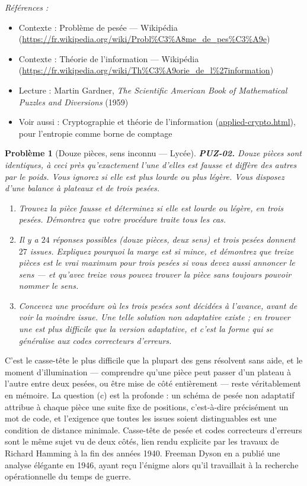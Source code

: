 \documentclass[11pt]{article}
\newtheorem{problem}{Problème}
\newenvironment{refs}{\par\small\noindent\emph{Références :}\begin{itemize}\setlength\itemsep{0pt}}{\end{itemize}\normalsize}
\begin{document}
\begin{refs}
\item Contexte : Problème de pesée --- Wikipédia (\url{https://fr.wikipedia.org/wiki/Probl%C3%A8me_de_pes%C3%A9e})
\item Contexte : Théorie de l'information --- Wikipédia (\url{https://fr.wikipedia.org/wiki/Th%C3%A9orie_de_l%27information})
\item Lecture : Martin Gardner, \textit{The Scientific American Book of Mathematical Puzzles and Diversions} (1959)
\item Voir aussi : Cryptographie et théorie de l'information (\url{applied-crypto.html}), pour l'entropie comme borne de comptage
\end{refs}

\bigskip

\begin{problem}[{Douze pièces, sens inconnu --- Lycée}]
\textbf{PUZ-02.} Douze pièces sont identiques, à ceci près qu'exactement l'une d'elles
est fausse et diffère des autres par le poids. Vous ignorez si elle est plus lourde ou
plus légère. Vous disposez d'une balance à plateaux et de trois pesées.
\begin{enumerate}
\item[(a)] Trouvez la pièce fausse \textit{et} déterminez si elle est lourde ou légère, en trois
pesées. Démontrez que votre procédure traite tous les cas.
\item[(b)] Il y a $ 24 $ réponses possibles (douze pièces, deux sens) et trois pesées donnent
$ 27 $ issues. Expliquez pourquoi la marge est si mince, et démontrez que treize pièces
est le vrai maximum pour trois pesées si vous devez aussi annoncer le sens --- et qu'avec
treize vous pouvez trouver la pièce sans toujours pouvoir nommer le sens.
\item[(c)] Concevez une procédure où les trois pesées sont décidées \textit{à l'avance}, avant de
voir la moindre issue. Une telle solution non adaptative existe ; en trouver une est plus
difficile que la version adaptative, et c'est la forme qui se généralise aux codes
correcteurs d'erreurs.
\end{enumerate}

\end{problem}

\noindent C'est le casse-tête le plus difficile que la plupart des gens résolvent
sans aide, et le moment d'illumination --- comprendre qu'une pièce peut passer d'un plateau
à l'autre entre deux pesées, ou être mise de côté entièrement --- reste véritablement en
mémoire. La question (c) est la profonde : un schéma de pesée non adaptatif attribue à
chaque pièce une suite fixe de positions, c'est-à-dire précisément un mot de code, et
l'exigence que toutes les issues soient distinguables est une condition de distance
minimale. Casse-tête de pesée et codes correcteurs d'erreurs sont le même sujet vu de deux
côtés, lien rendu explicite par les travaux de Richard Hamming à la fin des années 1940.
Freeman Dyson en a publié une analyse élégante en 1946, ayant reçu l'énigme alors qu'il
travaillait à la recherche opérationnelle du temps de guerre.
\end{document}
